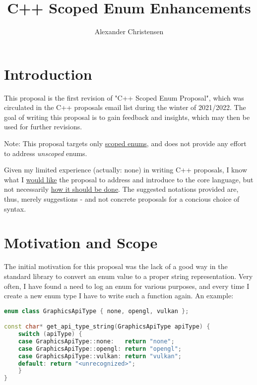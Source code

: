 \documentclass[
  format=manuscript,
  screen=true,
  review=false,
  nonacm=true,
  timestamp=true,
  balance=false]{acmart}
\author{Alexander Christensen}
\title{C++ Scoped Enum Enhancements}
\begin{document}

\maketitle
\tableofcontents

\section{Introduction}

This proposal is the first revision of "C++ Scoped Enum Proposal", which was circulated
in the C++ proposals email list during the winter of 2021/2022. The goal of writing
this proposal is to gain feedback and insights, which may then be used for further
revisions.

\noindent
Note: This proposal targets only \underline{scoped enums}, and does not provide any
effort to address \textit{unscoped} enums.

\vspace{2mm}\noindent
Given my limited experience (actually: none) in writing C++ proposals, I know what I
\underline{would like} the proposal to address and introduce to the core language,
but not necessarily \underline{how it should be done}. The suggested notations
provided are, thus, merely suggestions - and not concrete proposals for a concious
choice of syntax.


\section{Motivation and Scope}

The initial motivation for this proposal was the lack of a good way in the standard
library to convert an enum value to a proper string representation. Very often, I
have found a need to log an enum for various purposes, and every time I create a new
enum type I have to write such a function again. An example:\vspace{2mm}

\begin{lstlisting}[language=Cpp]
enum class GraphicsApiType { none, opengl, vulkan };

const char* get_api_type_string(GraphicsApiType apiType) {
    switch (apiType) {
    case GraphicsApiType::none:   return "none";
    case GraphicsApiType::opengl: return "opengl";
    case GraphicsApiType::vulkan: return "vulkan";
    default: return "<unrecognized>";
    }
}
\end{lstlisting}
\end{document}
